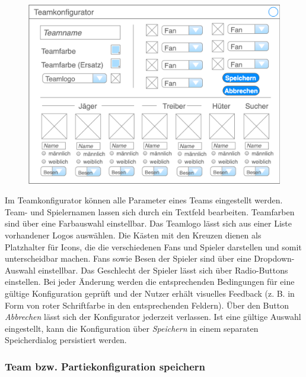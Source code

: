     \begin{figure}[H]
        \centering
        \includegraphics[width=\textwidth]{images/teamkonfigurator}
    \end{figure}

    Im Teamkonfigurator können alle Parameter eines Teams eingestellt werden. Team- und Spielernamen lassen sich durch ein Textfeld bearbeiten. Teamfarben sind über eine Farbauswahl einstellbar. Das Teamlogo lässt sich aus einer Liste vorhandener Logos auswählen. Die Kästen mit den Kreuzen dienen als Platzhalter für Icons, die die verschiedenen Fans und Spieler darstellen und somit unterscheidbar machen. Fans sowie Besen der Spieler sind über eine Dropdown-Auswahl einstellbar. Das Geschlecht der Spieler lässt sich über Radio-Buttons einstellen. Bei jeder Änderung werden die entsprechenden Bedingungen für eine gültige Konfiguration geprüft und der Nutzer erhält visuelles Feedback (z. B. in Form von roter Schriftfarbe in den entsprechenden Feldern). Über den Button \textit{Abbrechen} lässt sich der Konfigurator jederzeit verlassen. Ist eine gültige Auswahl eingestellt, kann die Konfiguration über \textit{Speichern} in einem separaten Speicherdialog persistiert werden.

    \subsubsection{Team bzw. Partiekonfiguration speichern}

